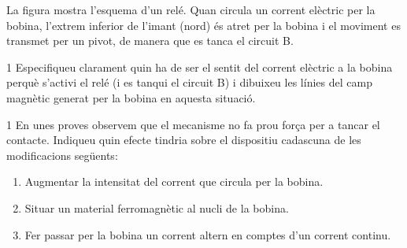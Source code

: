 La figura mostra l'esquema d'un relé. Quan circula un corrent elèctric per la bobina, l'extrem inferior de l'imant (nord) és atret per la bobina i el moviment es transmet per un pivot, de manera que es tanca el circuit B.


\begin{apartat}{1}
Especifiqueu clarament quin ha de ser el sentit del corrent elèctric a la bobina perquè s'activi el relé (i es tanqui el circuit B) i dibuixeu les línies del camp magnètic generat per la bobina en aquesta situació.
\end{apartat}

\begin{apartat}{1}
En unes proves observem que el mecanisme no fa prou força per a tancar el contacte. Indiqueu quin efecte tindria sobre el dispositiu cadascuna de les modificacions següents:
\begin{enumerate}
  \item[1)] Augmentar la intensitat del corrent que circula per la bobina.
  \item[2)] Situar un material ferromagnètic al nucli de la bobina.
  \item[3)] Fer passar per la bobina un corrent altern en comptes d'un corrent continu.
\end{enumerate}
\end{apartat}

